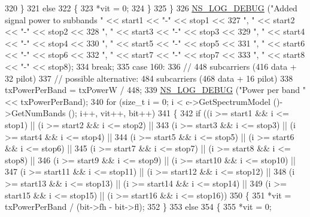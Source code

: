 \begin{DoxyCode}
320             \}
321           \textcolor{keywordflow}{else}
322             \{
323               *vit = 0;
324             \}
325         \}
326       \hyperlink{group__logging_ga413f1886406d49f59a6a0a89b77b4d0a}{NS\_LOG\_DEBUG} (\textcolor{stringliteral}{"Added signal power to subbands "} << start1 << \textcolor{stringliteral}{"-"} << stop1 <<
327                     \textcolor{stringliteral}{", "} << start2 << \textcolor{stringliteral}{"-"} << stop2 <<
328                     \textcolor{stringliteral}{", "} << start3 << \textcolor{stringliteral}{"-"} << stop3 <<
329                     \textcolor{stringliteral}{", "} << start4 << \textcolor{stringliteral}{"-"} << stop4 <<
330                     \textcolor{stringliteral}{", "} << start5 << \textcolor{stringliteral}{"-"} << stop5 <<
331                     \textcolor{stringliteral}{", "} << start6 << \textcolor{stringliteral}{"-"} << stop6 <<
332                     \textcolor{stringliteral}{", "} << start7 << \textcolor{stringliteral}{"-"} << stop7 <<
333                     \textcolor{stringliteral}{", "} << start8 << \textcolor{stringliteral}{"-"} << stop8);
334       \textcolor{keywordflow}{break};
335     \textcolor{keywordflow}{case} 160:
336       \textcolor{comment}{// 448 subcarriers (416 data + 32 pilot)}
337       \textcolor{comment}{// possible alternative:  484 subcarriers (468 data + 16 pilot)}
338       txPowerPerBand = txPowerW / 448;
339       \hyperlink{group__logging_ga413f1886406d49f59a6a0a89b77b4d0a}{NS\_LOG\_DEBUG} (\textcolor{stringliteral}{"Power per band "} << txPowerPerBand);
340       \textcolor{keywordflow}{for} (\textcolor{keywordtype}{size\_t} i = 0; i < c->GetSpectrumModel ()->GetNumBands (); i++, vit++, bit++)
341         \{
342           \textcolor{keywordflow}{if} ((i >= start1 && i <= stop1) || (i >= start2 && i <= stop2) ||
343               (i >= start3 && i <= stop3) || (i >= start4 && i <= stop4) ||
344               (i >= start5 && i <= stop5) || (i >= start6 && i <= stop6) ||
345               (i >= start7 && i <= stop7) || (i >= start8 && i <= stop8) ||
346               (i >= start9 && i <= stop9) || (i >= start10 && i <= stop10) ||
347               (i >= start11 && i <= stop11) || (i >= start12 && i <= stop12) ||
348               (i >= start13 && i <= stop13) || (i >= start14 && i <= stop14) ||
349               (i >= start15 && i <= stop15) || (i >= start16 && i <= stop16))
350             \{
351               *vit = txPowerPerBand / (bit->fh - bit->fl);
352             \}
353           \textcolor{keywordflow}{else}
354             \{
355               *vit = 0;

\end{DoxyCode}
